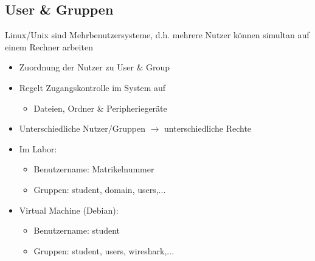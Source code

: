 \documentclass[xcolor=dvipsnames,aspectratio=169]{beamer}
\begin{document}
\subsection{User \& Gruppen}
\begin{frame}
Linux/Unix sind Mehrbenutzersysteme, d.h. mehrere Nutzer können simultan auf einem Rechner arbeiten
\begin{itemize}
	\item Zuordnung der Nutzer zu User \& Group
	\item Regelt Zugangskontrolle im System auf
	\begin{itemize}
	\item  Dateien, Ordner \& Peripheriegeräte
	\end{itemize}
	\item Unterschiedliche Nutzer/Gruppen $\rightarrow$ unterschiedliche Rechte
	\item Im Labor:
	\begin{itemize}
		\item Benutzername: Matrikelnummer
		\item Gruppen: student, domain, users,...
	\end{itemize}
	\item Virtual Machine (Debian):
	\begin{itemize}
		\item Benutzername: student
		\item Gruppen: student, users, wireshark,...
	\end{itemize}
\end{itemize}
\end{frame}
\end{document}
